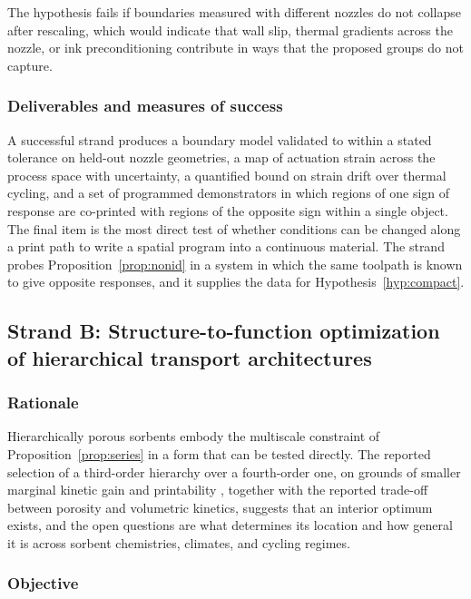 \documentclass[11pt]{article}
\theoremstyle{definition}
\begin{document}
The hypothesis fails if boundaries measured with different nozzles do not collapse after rescaling, which would indicate that wall slip, thermal gradients across the nozzle, or ink preconditioning contribute in ways that the proposed groups do not capture.

\subsubsection*{Deliverables and measures of success}

A successful strand produces a boundary model validated to within a stated tolerance on held-out nozzle geometries, a map of actuation strain across the process space with uncertainty, a quantified bound on strain drift over thermal cycling, and a set of programmed demonstrators in which regions of one sign of response are co-printed with regions of the opposite sign within a single object. The final item is the most direct test of whether conditions can be changed along a print path to write a spatial program into a continuous material. The strand probes Proposition~\ref{prop:nonid} in a system in which the same toolpath is known to give opposite responses, and it supplies the data for Hypothesis~\ref{hyp:compact}.

\subsection{Strand B: Structure-to-function optimization of hierarchical transport architectures}

\subsubsection*{Rationale}

Hierarchically porous sorbents embody the multiscale constraint of Proposition~\ref{prop:series} in a form that can be tested directly. The reported selection of a third-order hierarchy over a fourth-order one, on grounds of smaller marginal kinetic gain and printability \cite{bai2026}, together with the reported trade-off between porosity and volumetric kinetics, suggests that an interior optimum exists, and the open questions are what determines its location and how general it is across sorbent chemistries, climates, and cycling regimes.

\subsubsection*{Objective}
\end{document}
